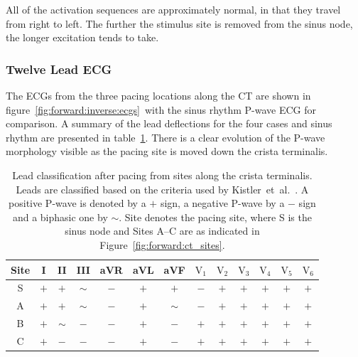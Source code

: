All of the activation sequences are approximately normal, in that they travel
from right to left.
The further the stimulus site is removed from the sinus node, the longer
excitation tends to take.


\subsubsection{Twelve Lead ECG}

The ECGs from the three pacing locations along the CT are shown in
figure~\ref{fig:forward:inverse:ecgs}\ with the sinus rhythm P-wave ECG for
comparison.
A summary of the lead deflections for the four cases and sinus rhythm are
presented in table~\ref{tbl:forward:inverse:ecgs}.
There is a clear evolution of the P-wave morphology visible as the pacing site
is moved down the crista terminalis.

\begin{table}
\caption[Lead classification from pacing sites along the CT]{
\label{tbl:forward:inverse:ecgs}
Lead classification after pacing from sites along the crista terminalis.
Leads are classified based on the criteria used by
Kistler~et~al.~\cite{Kistler2006}.
A positive P-wave is denoted by a $+$ sign, a negative P-wave by a $-$ sign and
a biphasic one by $\sim$.
Site denotes the pacing site, where S is the sinus node and Sites A--C are as
indicated in Figure~\ref{fig:forward:ct_sites}.
}
\begin{center}
\begin{tabular}{c c c c c c c c c c c c c}
\toprule
Site & I & II & III & aVR & aVL & aVF & $\text{V}_{\text{1}}$ &$\text{V}_{\text{2}}$ & $\text{V}_{\text{3}}$ & $\text{V}_{\text{4}}$ & $\text{V}_{\text{5}}$ & $\text{V}_{\text{6}}$\\
\midrule
S   & $+$ & $+$ & $\sim$ & $-$ & $+$ & $+$ & $-$ & $+$ & $+$ & $+$ & $+$ & $+$ \\
A   & $+$ & $+$ & $\sim$ & $-$ & $+$ & $\sim$ & $-$ & $+$ & $+$ & $+$ & $+$ & $+$ \\
B   & $+$ & $\sim$ & $-$ & $-$ & $+$ & $-$ & $+$ & $+$ & $+$ & $+$ & $+$ & $+$ \\
C   & $+$ & $-$ & $-$ & $-$ & $+$ & $-$ & $+$ & $+$ & $+$ & $+$ & $+$ & $+$ \\
\bottomrule
\end{tabular}
\end{center}
\end{table}

